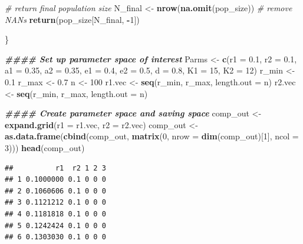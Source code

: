 \documentclass[
]{book}
\newenvironment{Shaded}{\begin{snugshade}}{\end{snugshade}}
\newcommand{\AttributeTok}[1]{\textcolor[rgb]{0.13,0.29,0.53}{#1}}
\newcommand{\CommentTok}[1]{\textcolor[rgb]{0.56,0.35,0.01}{\textit{#1}}}
\newcommand{\DecValTok}[1]{\textcolor[rgb]{0.00,0.00,0.81}{#1}}
\newcommand{\DocumentationTok}[1]{\textcolor[rgb]{0.56,0.35,0.01}{\textbf{\textit{#1}}}}
\newcommand{\FloatTok}[1]{\textcolor[rgb]{0.00,0.00,0.81}{#1}}
\newcommand{\FunctionTok}[1]{\textcolor[rgb]{0.13,0.29,0.53}{\textbf{#1}}}
\newcommand{\NormalTok}[1]{#1}
\newcommand{\OtherTok}[1]{\textcolor[rgb]{0.56,0.35,0.01}{#1}}
\newcommand{\SpecialCharTok}[1]{\textcolor[rgb]{0.81,0.36,0.00}{\textbf{#1}}}
\begin{document}
\begin{Shaded}
\begin{Highlighting}[]
  \CommentTok{\# return final population size}
\NormalTok{  N\_final }\OtherTok{\textless{}{-}} \FunctionTok{nrow}\NormalTok{(}\FunctionTok{na.omit}\NormalTok{(pop\_size))   }\CommentTok{\# remove NAN\textquotesingle{}s}
  \FunctionTok{return}\NormalTok{(pop\_size[N\_final, }\SpecialCharTok{{-}}\DecValTok{1}\NormalTok{])}

\NormalTok{\}}


\DocumentationTok{\#\#\#\# Set up parameter space of interest}
\NormalTok{Parms }\OtherTok{\textless{}{-}} \FunctionTok{c}\NormalTok{(}\AttributeTok{r1 =} \FloatTok{0.1}\NormalTok{, }\AttributeTok{r2 =} \FloatTok{0.1}\NormalTok{, }\AttributeTok{a1 =} \FloatTok{0.35}\NormalTok{, }\AttributeTok{a2 =} \FloatTok{0.35}\NormalTok{, }\AttributeTok{e1 =} \FloatTok{0.4}\NormalTok{, }\AttributeTok{e2 =} \FloatTok{0.5}\NormalTok{, }\AttributeTok{d =} \FloatTok{0.8}\NormalTok{, }\AttributeTok{K1 =} \DecValTok{15}\NormalTok{, }\AttributeTok{K2 =} \DecValTok{12}\NormalTok{)}
\NormalTok{r\_min }\OtherTok{\textless{}{-}} \FloatTok{0.1}
\NormalTok{r\_max }\OtherTok{\textless{}{-}} \FloatTok{0.7}
\NormalTok{n }\OtherTok{\textless{}{-}} \DecValTok{100}
\NormalTok{r1.vec }\OtherTok{\textless{}{-}} \FunctionTok{seq}\NormalTok{(r\_min, r\_max, }\AttributeTok{length.out =}\NormalTok{ n)}
\NormalTok{r2.vec }\OtherTok{\textless{}{-}} \FunctionTok{seq}\NormalTok{(r\_min, r\_max, }\AttributeTok{length.out =}\NormalTok{ n)}


\DocumentationTok{\#\#\#\# Create parameter space and saving space}
\NormalTok{comp\_out }\OtherTok{\textless{}{-}} \FunctionTok{expand.grid}\NormalTok{(}\AttributeTok{r1 =}\NormalTok{ r1.vec, }\AttributeTok{r2 =}\NormalTok{ r2.vec)}
\NormalTok{comp\_out }\OtherTok{\textless{}{-}} \FunctionTok{as.data.frame}\NormalTok{(}\FunctionTok{cbind}\NormalTok{(comp\_out,}
                                \FunctionTok{matrix}\NormalTok{(}\DecValTok{0}\NormalTok{, }\AttributeTok{nrow =} \FunctionTok{dim}\NormalTok{(comp\_out)[}\DecValTok{1}\NormalTok{], }\AttributeTok{ncol =} \DecValTok{3}\NormalTok{)))}
\FunctionTok{head}\NormalTok{(comp\_out)}
\end{Highlighting}
\end{Shaded}

\begin{verbatim}
##          r1  r2 1 2 3
## 1 0.1000000 0.1 0 0 0
## 2 0.1060606 0.1 0 0 0
## 3 0.1121212 0.1 0 0 0
## 4 0.1181818 0.1 0 0 0
## 5 0.1242424 0.1 0 0 0
## 6 0.1303030 0.1 0 0 0
\end{verbatim}
\end{document}
